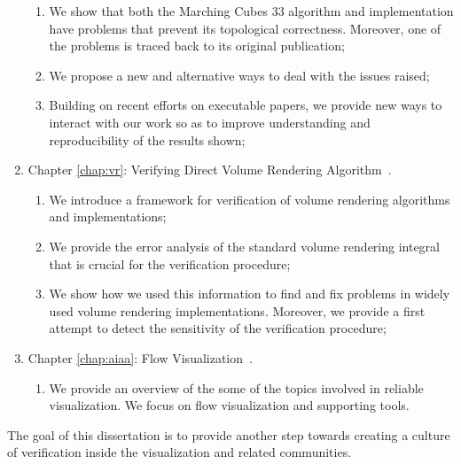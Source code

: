 \begin{enumerate}[topsep=0px,partopsep=0px,itemsep=0px,parsep=0px]
\begin{enumerate}[topsep=0px,partopsep=0px,itemsep=0px,parsep=0px]
\item We show that both the Marching Cubes 33 algorithm and implementation have problems that prevent its topological correctness. Moreover, one of the problems is traced back to its original publication;
\item We propose a new and alternative ways to deal with the issues raised;
\item Building on recent efforts on executable papers, we provide new ways to interact with our work so as to improve understanding and reproducibility of the results shown;
\end{enumerate}
\item Chapter \ref{chap:vr}: Verifying Direct Volume Rendering Algorithm~\cite{Etiene:2013}.
\begin{enumerate}[topsep=0px,partopsep=0px,itemsep=0px,parsep=0px]
\item We introduce a framework for verification of volume rendering algorithms and implementations;
\item We provide the error analysis of the standard volume rendering integral that is crucial for the verification procedure;
\item We show how we used this information to find and fix problems in widely used volume rendering  implementations. Moreover, we provide a first attempt to detect the sensitivity of the verification procedure;
\end{enumerate}
\item Chapter \ref{chap:aiaa}: Flow Visualization~\cite{Etiene:Flow:2013}.
\begin{enumerate}[topsep=0px,partopsep=0px,itemsep=0px,parsep=0px]
\item We provide an overview of the some of the topics involved in reliable visualization. We focus on flow visualization and supporting tools.
\end{enumerate}
\end{enumerate}
The goal of this dissertation is to provide another step towards creating a culture of verification inside the visualization and related communities.

